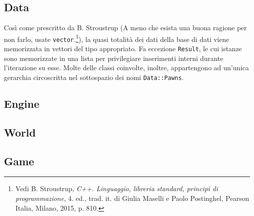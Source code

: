 \documentclass[a4paper]{article}
\begin{document}
\subsection{Data}

Così come prescritto da B. Stroustrup (\guillemotleft A meno che esista una buona ragione per
non farlo, usate \verb!vector!.\guillemotright\footnote{\label{note1} Vedi B.
Stroustrup, \emph{C++. Linguaggio, libreria standard, principi di
programmazione}, 4. ed., trad. it. di Giulia Maselli e Paolo Postinghel, Pearson
Italia, Milano, 2015, p. 810.}), la quasi totalità dei dati della base di
dati viene memorizzata in vettori del tipo appropriato. Fa eccezione
\verb!Result!, le cui istanze sono memorizzate in una lista per privilegiare
inserimenti interni durante l'iterazione su esse. Molte delle classi coinvolte,
inoltre, appartengono ad un'unica gerarchia circoscritta nel sottospazio dei
nomi \verb!Data::Pawns!.

\subsection{Engine}


\subsection{World}

\subsection{Game}
\end{document}
